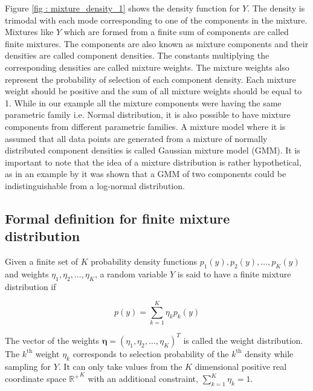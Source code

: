 Figure \ref{fig : mixture_density_1} shows the density function for $Y$. The density is trimodal with each mode corresponding to one of the components in the mixture. Mixtures like $Y$ which are formed from a finite sum of components are called finite mixtures. The components are also known as mixture components and their densities are called component densities. The constants multiplying the corresponding densities are called mixture weights. The mixture weights also represent the probability of selection of each component density. Each mixture weight should be positive and the sum of all mixture weights should be equal to 1. While in our example all the  mixture components were having the same parametric family i.e. Normal distribution, it is also possible to have mixture components from different parametric families. A mixture model where it is assumed that all data points are generated from a mixture of normally distributed component densities is called Gaussian mixture model (GMM). It is important to note that the idea of a mixture distribution is rather hypothetical, as in an example by \citet{titterington_statistical_1986} it was shown that a GMM of two components could be indistinguishable from a log-normal distribution.

\subsection{Formal definition for finite mixture distribution}
\label{subsec : formal_def_mixture_dist}
Given a finite set of $K$ probability density functions $p_1(y), p_2(y), \ldots, p_K(y)$ and weights $\eta_1, \eta_2, \ldots, \eta_K$, a random variable $Y$ is said to have a finite mixture distribution if

$$p(y) = \sum_{k=1}^{K} \eta_{k} p_{k}(y)$$

The vector of the weights $\boldsymbol{\eta} = (\eta_1, \eta_2, \ldots, \eta_K)^T$ is called the weight distribution. The $k^\text{th}$ weight $\eta_{k}$ corresponds to selection probability of the $k^\text{th}$ density while sampling for $Y$. It can only take values from the $K$ dimensional positive real coordinate space ${\mathbb{R}^{+}}^K$ with an additional constraint, $\sum_{k=1}^{K} \eta_{k} = 1$.\\

